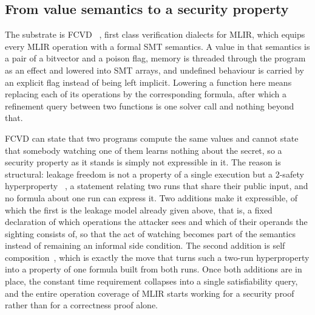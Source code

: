 \subsection{From value semantics to a security property}
\label{sec:verify:fcvd}

The substrate is FCVD~ \cite{fcvd2025}, first class verification dialects for MLIR, which equips every MLIR operation with a formal SMT semantics.
A value in that semantics is a pair of a bitvector and a poison flag, memory is threaded through the program as an effect and lowered into SMT arrays, and undefined behaviour is carried by an explicit flag instead of being left implicit.
Lowering a function here means replacing each of its operations by the corresponding formula, after which a refinement query between two functions is one solver call and nothing beyond that.

FCVD can state that two programs compute the same values and cannot state that somebody watching one of them learns nothing about the secret, so a security property as it stands is simply not expressible in it.
The reason is structural: leakage freedom is not a property of a single execution but a 2-safety hyperproperty ~\cite{clarkson2010hyperproperties}, a statement relating two runs that share their public input, and no formula about one run can express it.
Two additions make it expressible, of which the first is the leakage model already given above, that is, a fixed declaration of which operations the attacker sees and which of their operands the sighting consists of, so that the act of watching becomes part of the semantics instead of remaining an informal side condition.
The second addition is self composition~\cite{barthe2004selfcomposition}, which is exactly the move that turns such a two-run hyperproperty into a property of one formula built from both runs.
Once both additions are in place, the constant time requirement collapses into a single satisfiability query, and the entire operation coverage of MLIR starts working for a security proof rather than for a correctness proof alone.

